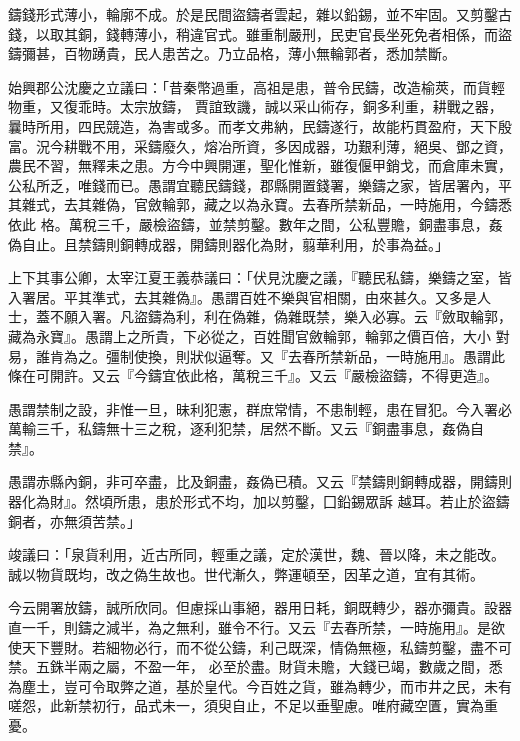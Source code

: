 \begin{pinyinscope}
 鑄錢形式薄小，輪廓不成。於是民間盜鑄者雲起，雜以鉛錫，並不牢固。又剪鑿古錢，以取其銅，錢轉薄小，稍違官式。雖重制嚴刑，民吏官長坐死免者相係，而盜鑄彌甚，百物踴貴，民人患苦之。乃立品格，薄小無輪郭者，悉加禁斷。



 始興郡公沈慶之立議曰：「昔秦幣過重，高祖是患，普令民鑄，改造榆莢，而貨輕物重，又復乖時。太宗放鑄，
 賈誼致譏，誠以采山術存，銅多利重，耕戰之器，曩時所用，四民競造，為害或多。而孝文弗納，民鑄遂行，故能朽貫盈府，天下殷富。況今耕戰不用，采鑄廢久，熔冶所資，多因成器，功艱利薄，絕吳、鄧之資，農民不習，無釋耒之患。方今中興開運，聖化惟新，雖復偃甲銷戈，而倉庫未實，公私所乏，唯錢而已。愚謂宜聽民鑄錢，郡縣開置錢署，樂鑄之家，皆居署內，平其雜式，去其雜偽，官斂輪郭，藏之以為永寶。去春所禁新品，一時施用，今鑄悉依此
 格。萬稅三千，嚴檢盜鑄，並禁剪鑿。數年之間，公私豐贍，銅盡事息，姦偽自止。且禁鑄則銅轉成器，開鑄則器化為財，翦華利用，於事為益。」



 上下其事公卿，太宰江夏王義恭議曰：「伏見沈慶之議，『聽民私鑄，樂鑄之室，皆入署居。平其準式，去其雜偽』。愚謂百姓不樂與官相關，由來甚久。又多是人士，蓋不願入署。凡盜鑄為利，利在偽雜，偽雜既禁，樂入必寡。云『斂取輪郭，藏為永寶』。愚謂上之所貴，下必從之，百姓聞官斂輪郭，輪郭之價百倍，大小
 對易，誰肯為之。彊制使換，則狀似逼奪。又『去春所禁新品，一時施用』。愚謂此條在可開許。又云『今鑄宜依此格，萬稅三千』。又云『嚴檢盜鑄，不得更造』。



 愚謂禁制之設，非惟一旦，昧利犯憲，群庶常情，不患制輕，患在冒犯。今入署必萬輸三千，私鑄無十三之稅，逐利犯禁，居然不斷。又云『銅盡事息，姦偽自禁』。



 愚謂赤縣內銅，非可卒盡，比及銅盡，姦偽已積。又云『禁鑄則銅轉成器，開鑄則器化為財』。然頃所患，患於形式不均，加以剪鑿，囗鉛錫眾訴
 越耳。若止於盜鑄銅者，亦無須苦禁。」



 竣議曰：「泉貨利用，近古所同，輕重之議，定於漢世，魏、晉以降，未之能改。誠以物貨既均，改之偽生故也。世代漸久，弊運頓至，因革之道，宜有其術。



 今云開署放鑄，誠所欣同。但慮採山事絕，器用日耗，銅既轉少，器亦彌貴。設器直一千，則鑄之減半，為之無利，雖令不行。又云『去春所禁，一時施用』。是欲使天下豐財。若細物必行，而不從公鑄，利己既深，情偽無極，私鑄剪鑿，盡不可禁。五銖半兩之屬，不盈一年，
 必至於盡。財貨未贍，大錢已竭，數歲之間，悉為塵土，豈可令取弊之道，基於皇代。今百姓之貨，雖為轉少，而市井之民，未有嗟怨，此新禁初行，品式未一，須臾自止，不足以垂聖慮。唯府藏空匱，實為重憂。




\end{pinyinscope}
